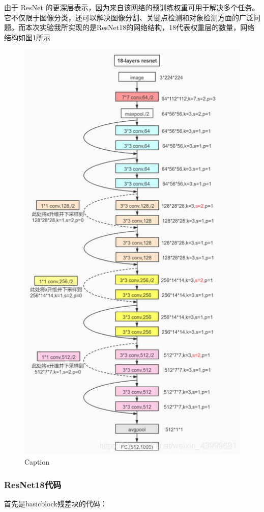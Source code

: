 \documentclass[UTF8,a4paper,10pt]{ctexart}
\begin{document}
由于 ResNet 的更深层表示，因为来自该网络的预训练权重可用于解决多个任务。它不仅限于图像分类，还可以解决图像分割、关键点检测和对象检测方面的广泛问题。而本次实验我所实现的是ResNet18的网络结构，18代表权重层的数量，网络结构如图\ref{fig:1}所示
\begin{figure}[H]
    \centering
    \includegraphics[scale=0.5]{1.png}
    \caption{Caption}
    \label{fig:1}
\end{figure}

\subsubsection{ResNet18代码}

首先是basicblock残差块的代码：
\end{document}
